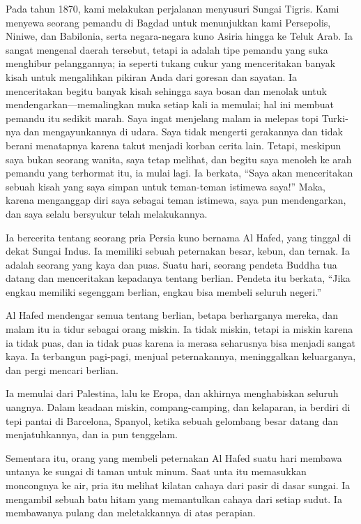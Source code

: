 \documentclass[
  letterpaper,
  DIV=11,
  numbers=noendperiod]{scrreprt}
\begin{document}
Pada tahun 1870, kami melakukan perjalanan menyusuri Sungai Tigris. Kami
menyewa seorang pemandu di Bagdad untuk menunjukkan kami Persepolis,
Niniwe, dan Babilonia, serta negara-negara kuno Asiria hingga ke Teluk
Arab. Ia sangat mengenal daerah tersebut, tetapi ia adalah tipe pemandu
yang suka menghibur pelanggannya; ia seperti tukang cukur yang
menceritakan banyak kisah untuk mengalihkan pikiran Anda dari goresan
dan sayatan. Ia menceritakan begitu banyak kisah sehingga saya bosan dan
menolak untuk mendengarkan---memalingkan muka setiap kali ia memulai;
hal ini membuat pemandu itu sedikit marah. Saya ingat menjelang malam ia
melepas topi Turki-nya dan mengayunkannya di udara. Saya tidak mengerti
gerakannya dan tidak berani menatapnya karena takut menjadi korban
cerita lain. Tetapi, meskipun saya bukan seorang wanita, saya tetap
melihat, dan begitu saya menoleh ke arah pemandu yang terhormat itu, ia
mulai lagi. Ia berkata, ``Saya akan menceritakan sebuah kisah yang saya
simpan untuk teman-teman istimewa saya!'' Maka, karena menganggap diri
saya sebagai teman istimewa, saya pun mendengarkan, dan saya selalu
bersyukur telah melakukannya.

Ia bercerita tentang seorang pria Persia kuno bernama Al Hafed, yang
tinggal di dekat Sungai Indus. Ia memiliki sebuah peternakan besar,
kebun, dan ternak. Ia adalah seorang yang kaya dan puas. Suatu hari,
seorang pendeta Buddha tua datang dan menceritakan kepadanya tentang
berlian. Pendeta itu berkata, ``Jika engkau memiliki segenggam berlian,
engkau bisa membeli seluruh negeri.''

Al Hafed mendengar semua tentang berlian, betapa berharganya mereka, dan
malam itu ia tidur sebagai orang miskin. Ia tidak miskin, tetapi ia
miskin karena ia tidak puas, dan ia tidak puas karena ia merasa
seharusnya bisa menjadi sangat kaya. Ia terbangun pagi-pagi, menjual
peternakannya, meninggalkan keluarganya, dan pergi mencari berlian.

Ia memulai dari Palestina, lalu ke Eropa, dan akhirnya menghabiskan
seluruh uangnya. Dalam keadaan miskin, compang-camping, dan kelaparan,
ia berdiri di tepi pantai di Barcelona, Spanyol, ketika sebuah gelombang
besar datang dan menjatuhkannya, dan ia pun tenggelam.

Sementara itu, orang yang membeli peternakan Al Hafed suatu hari membawa
untanya ke sungai di taman untuk minum. Saat unta itu memasukkan
moncongnya ke air, pria itu melihat kilatan cahaya dari pasir di dasar
sungai. Ia mengambil sebuah batu hitam yang memantulkan cahaya dari
setiap sudut. Ia membawanya pulang dan meletakkannya di atas perapian.
\end{document}
